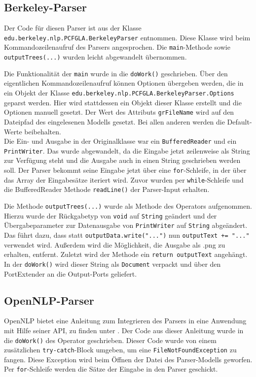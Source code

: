 \subsection{Berkeley-Parser}

Der Code für diesen Parser ist aus der Klasse \texttt{edu.berkeley.nlp.PCFGLA.BerkeleyParser} entnommen. Diese Klasse wird beim Kommandozeilenaufruf des Parsers angesprochen. Die \texttt{main}-Methode sowie \texttt{outputTrees(...)} wurden leicht abgewandelt übernommen. 

Die Funktionalität der \texttt{main} wurde in die \texttt{doWork()} geschrieben. Über den eigentlichen Kommandozeilenaufruf können Optionen übergeben werden, die in ein Objekt der Klasse \texttt{edu.berkeley.nlp.PCFGLA.BerkeleyParser.Options} geparst werden. Hier wird stattdessen ein Objekt dieser Klasse erstellt und die Optionen manuell gesetzt. Der Wert des Attributs \texttt{grFileName} wird auf den Dateipfad des eingelesenen Modells gesetzt. Bei allen anderen werden die Default-Werte beibehalten.\\ 
Die Ein- und Ausgabe in der Originalklasse war ein \texttt{BufferedReader} und ein \texttt{PrintWriter}. Das wurde abgewandelt, da die Eingabe jetzt zeilenweise als String zur Verfügung steht und die Ausgabe auch in einen String geschrieben werden soll. Der Parser bekommt seine Eingabe jetzt über eine \texttt{for}-Schleife, in der über das Array der Eingabesätze iteriert wird. Zuvor wurden per \texttt{while}-Schleife und die BufferedReader Methode \texttt{readLine()} der Parser-Input erhalten.

Die Methode \texttt{outputTrees(...)} wurde als Methode des Operators aufgenommen. Hierzu wurde der Rückgabetyp von \texttt{void} auf \texttt{String} geändert und der Übergabeparameter zur Datenausgabe von \texttt{PrintWriter} auf \texttt{String} abgeändert. Das führt dazu, dass statt \texttt{outputData.write("...")} nun \texttt{outputText += "..."} verwendet wird. Außerdem wird die Möglichkeit, die Ausgabe als .png zu erhalten, entfernt. Zuletzt wird der Methode ein \texttt{return outputText} angehängt. In der \texttt{doWork()} wird dieser String als \texttt{Document} verpackt und über den PortExtender an die Output-Ports geliefert.

\subsection{OpenNLP-Parser}
\label{sec:impl:eigene:opennlp}

OpenNLP bietet eine Anleitung zum Integrieren des Parsers in eine Anwendung mit Hilfe seiner API, zu finden unter \cite{openNlpManual}. %
Der Code aus dieser Anleitung wurde in die \texttt{doWork()} des Operator geschrieben. Dieser Code wurde von einem zusätzlichen \texttt{try-catch}-Block umgeben, um eine \texttt{FileNotFoundException} zu fangen. Diese Exception wird beim Öffnen der Datei des Parser-Modells geworfen. Per \texttt{for}-Schleife werden die Sätze der Eingabe in den Parser geschickt. 

